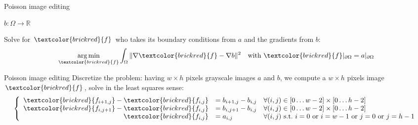 \documentclass[UKenglish,aspectratio=169]{beamer}
\DeclareMathOperator*{\argmin}{arg\,min}
\newcommand\unknown[1]{\textcolor{brickred}{#1}}
\begin{document}
\begin{frame}{Poisson image editing}
\begin{minipage}{.12\linewidth}
$b:\Omega\rightarrow \mathbb R$
\end{minipage}
\qquad
\pause
\begin{minipage}{.6\linewidth}
Solve for $\unknown{f}$ who takes its boundary conditions from $a$ and the gradients from $b$:
$$
\argmin\limits_{\unknown{f}} \int_\Omega \|\nabla \unknown{f} - \nabla b\|^2 \quad \text{with~} \unknown{f}|_{\partial\Omega} = a|_{\partial\Omega}
$$
\end{minipage}
\end{frame}

\begin{frame}{Poisson image editing}
Discretize the problem: having $w \times h$ pixels grayscale images $a$ and $b$,
we compute a $w \times h$ pixels image $\unknown{f}$, solve in the least squares sense:
$$
\left \{ \begin{array}{rll}
\unknown{f_{i+1, j}}-\unknown{f_{i,j}} & = b_{i+1, j}-b_{i,j} & \forall (i,j) \in [0 \dots w-2] \times [0\dots h-2]\\
\unknown{f_{i, j+1}}-\unknown{f_{i,j}} & = b_{i, j+1}-b_{i,j} & \forall (i,j) \in [0 \dots w-2] \times [0\dots h-2]\\
\unknown{f_{i,j}}            & = a_{i,j}            & \forall (i,j) \text{~s.t.~} i=0 \text{~or~} i=w-1 \text{~or~} j=0 \text{~or~} j=h-1
\end{array} \right.
$$
\end{frame}
\end{document}

